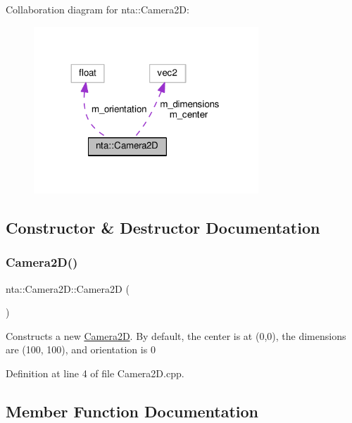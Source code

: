 Collaboration diagram for nta\+:\+:Camera2D\+:\nopagebreak
\begin{figure}[H]
\begin{center}
\leavevmode
\includegraphics[width=239pt]{d0/d63/classnta_1_1Camera2D__coll__graph}
\end{center}
\end{figure}


\subsection{Constructor \& Destructor Documentation}
\mbox{\label{classnta_1_1Camera2D_a11aada3f997c594ade11dd3c46d826f4}} 
\subsubsection{\texorpdfstring{Camera2\+D()}{Camera2D()}}
{\footnotesize\ttfamily nta\+::\+Camera2\+D\+::\+Camera2D (\begin{DoxyParamCaption}{ }\end{DoxyParamCaption})}

Constructs a new \hyperlink{classnta_1_1Camera2D}{Camera2D}. By default, the center is at (0,0), the dimensions are (100, 100), and orientation is 0 

Definition at line 4 of file Camera2\+D.\+cpp.



\subsection{Member Function Documentation}
\mbox{\label{classnta_1_1Camera2D_a711b1b64b4e0bbca5c598ac15609f498}} 
